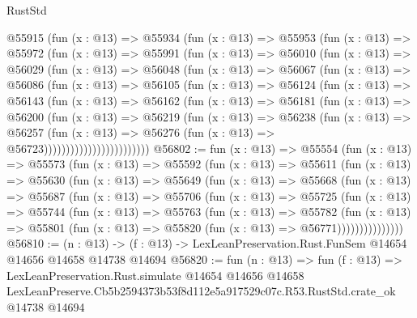 \begin{lexlean}{RustStd}
\begin{coremodule}
          @55915
            (fun (x : @13) =>
            @55934
              (fun (x : @13) =>
              @55953
                (fun (x : @13) =>
                @55972
                  (fun (x : @13) =>
                  @55991
                    (fun (x : @13) =>
                    @56010
                      (fun (x : @13) =>
                      @56029
                        (fun (x : @13) =>
                        @56048
                          (fun (x : @13) =>
                          @56067
                            (fun (x : @13) =>
                            @56086
                              (fun (x : @13) =>
                              @56105
                                (fun (x : @13) =>
                                @56124
                                  (fun (x : @13) =>
                                  @56143
                                    (fun (x : @13) =>
                                    @56162
                                      (fun (x : @13) =>
                                      @56181
                                        (fun (x : @13) =>
                                        @56200
                                          (fun (x : @13) =>
                                          @56219
                                            (fun (x : @13) =>
                                            @56238
                                              (fun (x : @13) =>
                                              @56257
                                                (fun (x : @13) =>
                                                @56276
                                                  (fun (x : @13) => @56723))))))))))))))))))))))))
@56802 := fun (x : @13) =>
  @55554
    (fun (x : @13) =>
    @55573
      (fun (x : @13) =>
      @55592
        (fun (x : @13) =>
        @55611
          (fun (x : @13) =>
          @55630
            (fun (x : @13) =>
            @55649
              (fun (x : @13) =>
              @55668
                (fun (x : @13) =>
                @55687
                  (fun (x : @13) =>
                  @55706
                    (fun (x : @13) =>
                    @55725
                      (fun (x : @13) =>
                      @55744
                        (fun (x : @13) =>
                        @55763
                          (fun (x : @13) =>
                          @55782
                            (fun (x : @13) =>
                            @55801 (fun (x : @13) => @55820 (fun (x : @13) => @56771)))))))))))))))
@56810 := (n : @13) ->
  (f : @13) -> LexLeanPreservation.Rust.FunSem @14654 @14656 @14658 @14738 @14694
@56820 := fun (n : @13) =>
  fun (f : @13) =>
  LexLeanPreservation.Rust.simulate
    @14654
    @14656
    @14658
    LexLeanPreserve.Cb5b2594373b53f8d112e5a917529c07c.R53.RustStd.crate_ok
    @14738
    @14694
\end{coremodule}
\end{lexlean}

